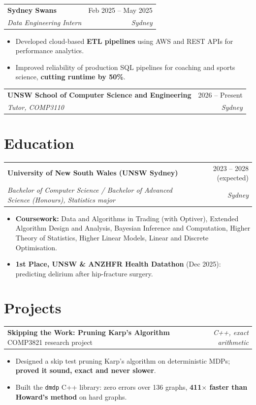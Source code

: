 \documentclass[10pt]{article}
\makeatletter
\newcommand{\role}[4]{%
  \vspace{3.5pt}%
  \begin{tabularx}{\linewidth}{@{}X r@{}}
    \textbf{#1} & #2 \\
    \textit{#3} & \textit{\color{muted}#4} \\
  \end{tabularx}\vspace{-1pt}}
\newcommand{\project}[3]{%
  \vspace{3.5pt}%
  \begin{tabularx}{\linewidth}{@{}X r@{}}
    \textbf{#1}\,{\color{muted}\textbar}\, #2 & \textit{\color{muted}#3} \\
  \end{tabularx}\vspace{-1pt}}
\makeatother
\begin{document}
\role{Sydney Swans}{Feb 2025 -- May 2025}{Data Engineering Intern}{Sydney}
\begin{itemize}
  \item Developed cloud-based \textbf{ETL pipelines} using AWS and REST APIs for performance analytics.
  \item Improved reliability of production SQL pipelines for coaching and sports science, \textbf{cutting runtime by 50\%}.
\end{itemize}

\role{UNSW School of Computer Science and Engineering}{2026 -- Present}{Tutor, COMP3110}{Sydney}

\section{Education}

\role{University of New South Wales (UNSW Sydney)}{2023 -- 2028 (expected)}{Bachelor of Computer Science / Bachelor of Advanced Science (Honours), Statistics major}{Sydney}
\begin{itemize}
  \item \textbf{Coursework:} Data and Algorithms in Trading (with Optiver), Extended Algorithm Design and Analysis, Bayesian Inference and Computation, Higher Theory of Statistics, Higher Linear Models, Linear and Discrete Optimisation.
  \item \textbf{1st Place, UNSW \& ANZHFR Health Datathon} (Dec 2025): predicting delirium after hip-fracture surgery.
\end{itemize}

\section{Projects}

\project{Skipping the Work: Pruning Karp's Algorithm}{COMP3821 research project}{C++, exact arithmetic}
\begin{itemize}
  \item Designed a skip test pruning Karp's algorithm on deterministic MDPs; \textbf{proved it sound, exact and never slower}.
  \item Built the \texttt{dmdp} C++ library: zero errors over 136 graphs, \textbf{411$\times$ faster than Howard's method} on hard graphs.
\end{itemize}
\end{document}
